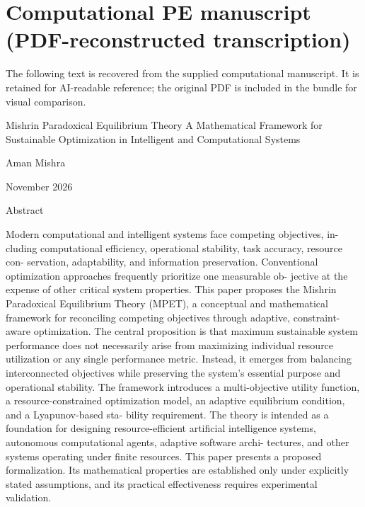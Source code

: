 \documentclass[10pt,a4paper]{article}
\begin{document}
\section{Computational PE manuscript (PDF-reconstructed transcription)}
The following text is recovered from the supplied computational manuscript. It is retained for AI-readable reference; the original PDF is included in the bundle for visual comparison.
\begin{ManuscriptText}
Mishrin Paradoxical Equilibrium Theory
 A Mathematical Framework for Sustainable Optimization in Intelligent
                            and Computational Systems

                                      Aman Mishra

                                     November 2026


                                          Abstract

        Modern computational and intelligent systems face competing objectives, in-
     cluding computational efficiency, operational stability, task accuracy, resource con-
     servation, adaptability, and information preservation.
        Conventional optimization approaches frequently prioritize one measurable ob-
     jective at the expense of other critical system properties.
        This paper proposes the Mishrin Paradoxical Equilibrium Theory (MPET),
     a conceptual and mathematical framework for reconciling competing objectives
     through adaptive, constraint-aware optimization.
        The central proposition is that maximum sustainable system performance does
     not necessarily arise from maximizing individual resource utilization or any single
     performance metric. Instead, it emerges from balancing interconnected objectives
     while preserving the system’s essential purpose and operational stability.
        The framework introduces a multi-objective utility function, a resource-constrained
     optimization model, an adaptive equilibrium condition, and a Lyapunov-based sta-
     bility requirement.
        The theory is intended as a foundation for designing resource-efficient artificial
     intelligence systems, autonomous computational agents, adaptive software archi-
     tectures, and other systems operating under finite resources.
        This paper presents a proposed formalization. Its mathematical properties are
     established only under explicitly stated assumptions, and its practical effectiveness
     requires experimental validation.


\end{ManuscriptText}
\end{document}
